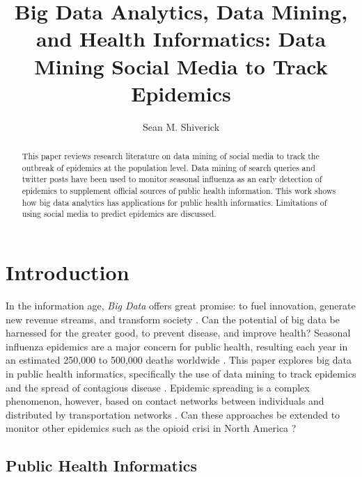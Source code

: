 \documentclass[sigconf]{acmart}
\begin{document}
\title{Big Data Analytics, Data Mining, and Health Informatics: 
Data Mining Social Media to Track Epidemics}
\author{Sean M. Shiverick}


\begin{abstract}
This paper reviews research literature on data mining of social media to 
track the outbreak of epidemics at the population level. Data mining of 
search queries and twitter posts have been used to monitor seasonal influenza
as an early detection of epidemics to supplement official sources of public 
health information. This work shows how big data analytics has applications 
for public health informatics. Limitations of using social media to predict 
epidemics are discussed.
\end{abstract}



\maketitle

\section{Introduction}

In the information age, \textit{Big Data} offers great promise: to fuel innovation, 
generate new revenue streams, and transform society \cite{gupta15}. Can the 
potential of big data be harnessed for the greater good, to prevent disease, 
and improve health? Seasonal influenza epidemics are a major concern for public 
health, resulting each year in an estimated 250,000 to 500,000 deaths worldwide 
\cite{who17}. This paper explores big data in public health informatics, 
specifically the use of data mining to track epidemics and the spread of 
contagious disease \cite{hay13}. Epidemic spreading is a complex phenomenon, 
however, based on contact networks between individuals and distributed by 
transportation networks \cite{Colizza06}. Can these approaches be extended to 
monitor other epidemics such as the opioid crisi in North America \cite{volkow14}?


\subsection{Public Health Informatics}
\end{document}
